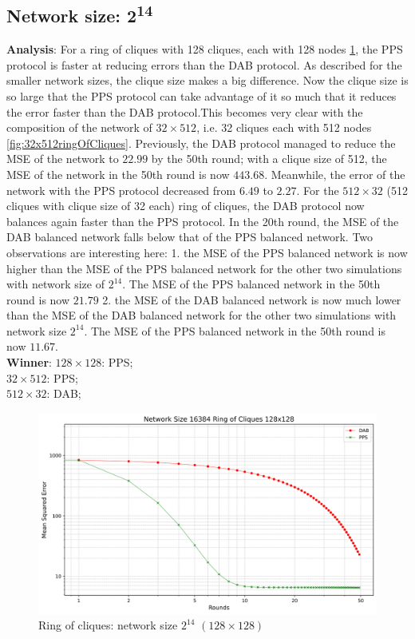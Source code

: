 \subsection{Network size: 2\textsuperscript{14}}
\textbf{Analysis}: For a ring of cliques with 128 cliques, each with 128 nodes \ref{fig:128x128ringOfCliques}, the PPS protocol is faster at reducing errors than the DAB protocol. As described for the smaller network sizes, the clique size makes a big difference. Now the clique size is so large that the PPS protocol can take advantage of it so much that it reduces the error faster than the DAB protocol.This becomes very clear with the composition of the network of $32 \times 512$, i.e. 32 cliques each with 512 nodes \ref{fig:32x512ringOfCliques}. Previously, the DAB protocol managed to reduce the MSE of the network to $22.99$ by the 50th round; with a clique size of 512, the MSE of the network in the 50th round is now $443.68$. Meanwhile, the error of the network with the PPS protocol decreased from $6.49$ to $2.27$. For the $512 \times 32$ (512 cliques with clique size of 32 each) ring of cliques, the DAB protocol now balances again faster than the PPS protocol. In the 20th round, the MSE of the DAB balanced network falls below that of the PPS balanced network. Two observations are interesting here:
1. the MSE of the PPS balanced network is now higher than the MSE of the PPS balanced network for the other two simulations with network size of $2^{14}$. The MSE of the PPS balanced network in the 50th round is now $21.79$
2. the MSE of the DAB balanced network is now much lower than the MSE of the DAB balanced network for the other two simulations with network size $2^{14}$. The MSE of the PPS balanced network in the 50th round is now $11.67$.\\
\textbf{Winner}: $128\times128$: PPS; \\
$32\times512$: PPS; \\
$512\times32$: DAB;

\begin{figure}[H]
    \centering
    \includegraphics[scale=0.5]{figures/ringOfCliquesSimulations/128x128/DAB_vs_PPS_RoC_r50_n16384.png}
    \caption{Ring of cliques: network size $2^{14}$ $(128\times128)$}
    \label{fig:128x128ringOfCliques}
\end{figure}

